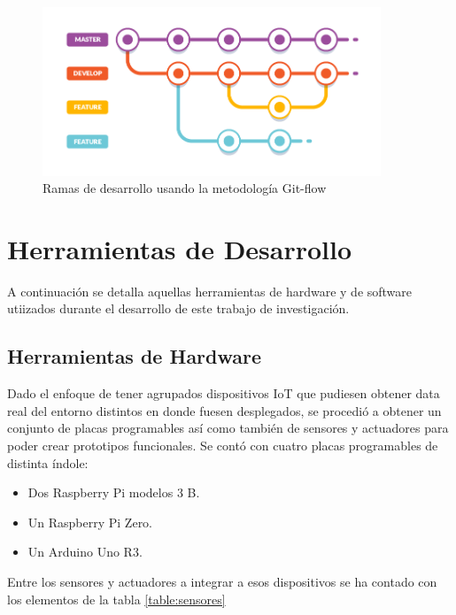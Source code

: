 \begin{figure}[ht]
\vspace*{-20pt}
\centering
\includegraphics[width=0.9\textwidth]{Figuras/gitflow.png}
\caption{\label{fig:gitflow}Ramas de desarrollo usando la metodología Git-flow}
\vspace*{-10pt}
\end{figure}

\section{Herramientas de Desarrollo}
A continuación se detalla aquellas herramientas de hardware y de software utiizados durante el desarrollo de este trabajo de investigación.

\subsection{Herramientas de Hardware}
Dado el enfoque de tener agrupados dispositivos IoT que pudiesen obtener data real del entorno distintos en donde fuesen desplegados, se procedió a obtener un conjunto de placas programables así como también de sensores y actuadores para poder crear prototipos funcionales. Se contó con cuatro placas programables de distinta índole:
\begin{itemize}
\item Dos Raspberry Pi modelos 3 B.
\item Un Raspberry Pi Zero.
\item Un Arduino Uno R3.
\end{itemize}

Entre los sensores y actuadores a integrar a esos dispositivos se ha contado con los elementos de la tabla \ref{table:sensores}

